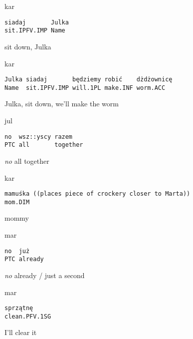 \documentclass[output=paper]{langsci/langscibook}
\begin{document}
\vspace{2mm}
%
\begin{transbox}{1}{kar}
\begin{verbatim}
siadaj       Julka
sit.IPFV.IMP Name
\end{verbatim}
sit down, Julka
\end{transbox}
%
%
\begin{transbox}{3}{kar}
\begin{verbatim}
Julka siadaj       będziemy robić    dżdżownicę
Name  sit.IPFV.IMP will.1PL make.INF worm.ACC
\end{verbatim}
Julka, sit down, we’ll make the worm
\end{transbox}
%
\begin{transbox}{4}{jul}
\begin{verbatim}
no  wsz::yscy razem
PTC all       together
\end{verbatim}
\textit{no} all together
\end{transbox}
%
%
\begin{mdframednoverticalspace}[style=firstfoc]
\begin{transbox}{6}{kar}
\begin{verbatim}
mamuśka ((places piece of crockery closer to Marta))
mom.DIM
\end{verbatim}
mommy 
\end{transbox}
\end{mdframednoverticalspace}
%
\begin{mdframednoverticalspace}[style=secondfoc]
\begin{transbox}{7}{mar}
\begin{verbatim}
no  już
PTC already
\end{verbatim}
\textit{no} already / just a second
\end{transbox}
\end{mdframednoverticalspace}
%
%
\begin{mdframednoverticalspace}[style=secondfoc]
\begin{transbox}{9}{mar}
\begin{verbatim}
sprzątnę
clean.PFV.1SG
\end{verbatim}
I’ll clear it
\end{transbox}
\end{mdframednoverticalspace}
%
%
\begin{mdframednoverticalspace}[style=secondfoc]
\end{mdframednoverticalspace}\vspace{-2mm}
\end{document}
